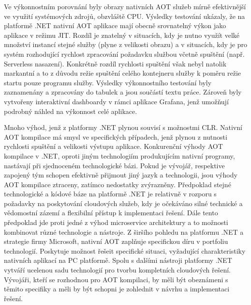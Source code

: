 Ve výkonnostním porovnání byly obrazy nativních AOT služeb mírně efektivnější ve využití systémových zdrojů, obzvláště CPU. Výsledky testování ukázaly, že na platformě .NET nativní AOT aplikace mají obecně srovnatelný výkon jako aplikace v režimu JIT. Rozdíl je znatelný v situacích, kdy je nutno využít velké množství instancí stejné služby (plyne z velikosti obrazu) a v situacích, kdy je pro systém rozhodující rychlost zpracování požadavku službou včetně spuštění (např. Serverless nasazení). Konkrétně rozdíl rychlosti spuštění však nebyl natolik markantní a to z důvodu režie spuštění celého kontejneru služby k poměru režie startu pouze programu služby. Výsledky výkonnostního testování byly zaznamenány a zpracovány do tabulek a jsou součástí textu práce. Zároveň byly vytvořeny interaktivní dashboardy v rámci aplikace Grafana, jenž umožňují podrobný náhled na výkonnost celé aplikace. 

Mnoho výhod, jenž z platformy .NET plynou souvisí s možnostmi CLR. Nativní AOT kompilace má smysl ve specifických případech, jenž plynou z nutnosti rychlosti spuštění a velikosti výstupu aplikace. Konkurenční výhody AOT kompilace v .NET, oproti jiným technologiím produkujícím nativní programy, nastávají při sjednoceném technologické bázi. Pokud je vývojář, respektive zapojený tým schopen efektivně přijmout jiný jazyk a technologii, jsou výhody AOT kompilace ztraceny, zatímco nedostatky zvýrazněny. Předpoklad stejné technologické a kódové báze na platformě .NET je relativně v rozporu s požadavky na poskytování cloudových služeb, kdy je očekáváno silné technické a vědomostní zázemí a flexibilní přístup k implementaci řešení. Dále tento předpoklad jde proti jedné z výhod microservice architektury a to možnosti kombinovat různé technologie a nástroje. Z širšího pohledu na platformu .NET a strategie firmy Microsoft, nativní AOT zaplňuje specifickou díru v portfoliu technologií. Poskytuje možnost řešeit specifické situaci, vyžadující charakteristiky nativních aplikací na PC platformě. Spolu s dalšími nástroji platformy .NET vytváří ucelenou sadu technologií pro tvorbu kompletních cloudových řešení. Vývojáři, kteří se rozhodnou pro AOT kompilaci, by měli být obeznámeni s těmito specifiky a měli by být schopni je zohlednit v návrhu a implementaci řešení.

